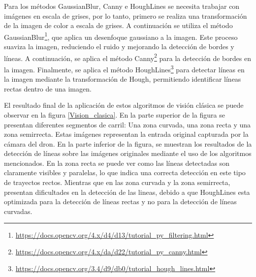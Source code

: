 Para los métodos GaussianBlur, Canny e HoughLines se necesita trabajar con imágenes en escala de grises, por lo tanto, primero se realiza una transformación de la imagen 
de color a escala de grises. A continuación se utiliza el método GaussianBlur\footnote{\url{https://docs.opencv.org/4.x/d4/d13/tutorial_py_filtering.html}}, que aplica un desenfoque 
gaussiano a la imagen. Este proceso suaviza la imagen, reduciendo el ruido y mejorando la detección de bordes y líneas. A continuación, se aplica el método Canny\footnote{\url{https://docs.opencv.org/4.x/da/d22/tutorial_py_canny.html}} 
para la detección de bordes en la imagen. Finalmente, se aplica el método HoughLines\footnote{\url{https://docs.opencv.org/3.4/d9/db0/tutorial_hough_lines.html}} 
para detectar líneas en la imagen mediante la transformación de Hough, permitiendo identificar líneas rectas dentro de una imagen. \newline

El resultado final de la aplicación de estos algoritmos de visión clásica se puede observar en la figura \ref{Vision_clasica}. En la parte superior de la figura se presentan diferentes segmentos
de carril: Una zona curvada, una zona recta y una zona semirrecta. Estas imágenes representan la entrada original capturada por la cámara del dron. En la parte inferior de la figura, 
se muestran los resultados de la detección de líneas sobre las imágenes originales mediante el uso de los algoritmos mencionados. En la zona recta se puede ver como las líneas
detectadas son claramente visibles y paralelas, lo que indica una correcta detección en este tipo de trayectos rectos. Mientras que en las zona curvada y la zona semirrecta, presentan
dificultades en la detección de las lineas, debido a que HoughLines esta optimizada para la detección de líneas rectas y no para la detección de líneas curvadas. 

